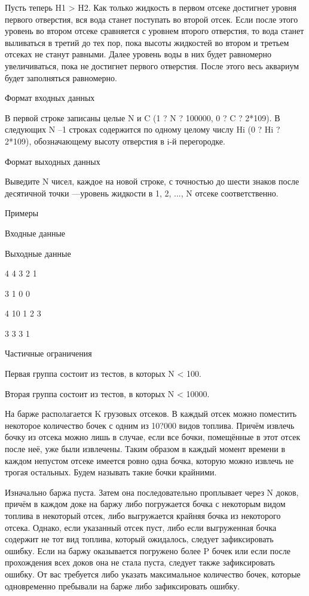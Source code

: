 \documentclass[]{article}
\begin{document}
Пусть теперь H1 > H2. Как только жидкость в первом отсеке достигнет уровня первого отверстия, вся вода станет поступать во второй отсек. Если после этого уровень во втором отсеке сравняется с уровнем второго отверстия, то вода станет выливаться в третий до тех пор, пока высоты жидкостей во втором и третьем отсеках не станут равными. Далее уровень воды в них будет равномерно увеличиваться, пока не достигнет первого отверстия. После этого весь аквариум будет заполняться равномерно.

Формат входных данных

В первой строке записаны целые N и C (1 ? N ? 100000, 0 ? C ? 2*109). В следующих N –1 строках содержится по одному целому числу Hi (0 ? Hi ? 2*109), обозначающему высоту отверстия в i-й перегородке.

Формат выходных данных

Выведите N чисел, каждое на новой строке, с точностью до шести знаков после десятичной точки —уровень жидкости в 1, 2, ..., N отсеке соответственно.

Примеры

Входные данные
	

Выходные данные

4 4
3
2
1
	

3
1
0
0

4 10
1
2
3
	

3
3
3
1

Частичные ограничения

Первая группа состоит из тестов, в которых N < 100.

Вторая группа состоит из тестов, в которых N < 10000.



На барже располагается K грузовых отсеков. В каждый отсек можно поместить некоторое количество бочек с одним из 10?000 видов топлива. Причём извлечь бочку из отсека можно лишь в случае, если все бочки, помещённые в этот отсек после неё, уже были извлечены. Таким образом в каждый момент времени в каждом непустом отсеке имеется ровно одна бочка, которую можно извлечь не трогая остальных. Будем называть такие бочки крайними.

Изначально баржа пуста. Затем она последовательно проплывает через N доков, причём в каждом доке на баржу либо погружается бочка с некоторым видом топлива в некоторый отсек, либо выгружается крайняя бочка из некоторого отсека. Однако, если указанный отсек пуст, либо если выгруженная бочка содержит не тот вид топлива, который ожидалось, следует зафиксировать ошибку. Если на баржу оказывается погружено более P бочек или если после прохождения всех доков она не стала пуста, следует также зафиксировать ошибку. От вас требуется либо указать максимальное количество бочек, которые одновременно пребывали на барже либо зафиксировать ошибку.
\end{document}
